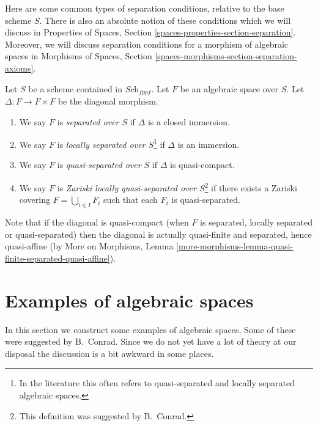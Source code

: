 \noindent
Here are some common types of separation conditions, relative to the base
scheme $S$. There is also an absolute notion of these conditions which we
will discuss in
Properties of Spaces, Section \ref{spaces-properties-section-separation}.
Moreover, we will discuss separation conditions for a morphism of
algebraic spaces in
Morphisms of Spaces, Section \ref{spaces-morphisms-section-separation-axioms}.

\begin{definition}
\label{definition-separated}
Let $S$ be a scheme contained in $\textit{Sch}_{fppf}$.
Let $F$ be an algebraic space over $S$.
Let $\Delta : F \to F \times F$ be the diagonal morphism.
\begin{enumerate}
\item We say $F$ is {\it separated over $S$} if $\Delta$ is a closed immersion.
\item We say $F$ is {\it locally separated over $S$}\footnote{In the
literature this often refers to quasi-separated and
locally separated algebraic spaces.} if $\Delta$ is an
immersion.
\item We say $F$ is {\it quasi-separated over $S$} if $\Delta$ is quasi-compact.
\item We say $F$ is {\it Zariski locally quasi-separated over $S$}\footnote{This
definition was suggested by B.\ Conrad.} if there
exists a Zariski covering $F = \bigcup_{i \in I} F_i$ such that
each $F_i$ is quasi-separated.
\end{enumerate}
\end{definition}

\noindent
Note that if the diagonal is quasi-compact (when $F$ is separated,
locally separated or quasi-separated) then the diagonal is actually
quasi-finite and separated, hence quasi-affine (by More on Morphisms,
Lemma \ref{more-morphisms-lemma-quasi-finite-separated-quasi-affine}).








\section{Examples of algebraic spaces}
\label{section-examples}

\noindent
In this section we construct some examples of algebraic spaces.
Some of these were suggested by B.\ Conrad.
Since we do not yet have a lot of theory at our disposal the
discussion is a bit awkward in some places.

